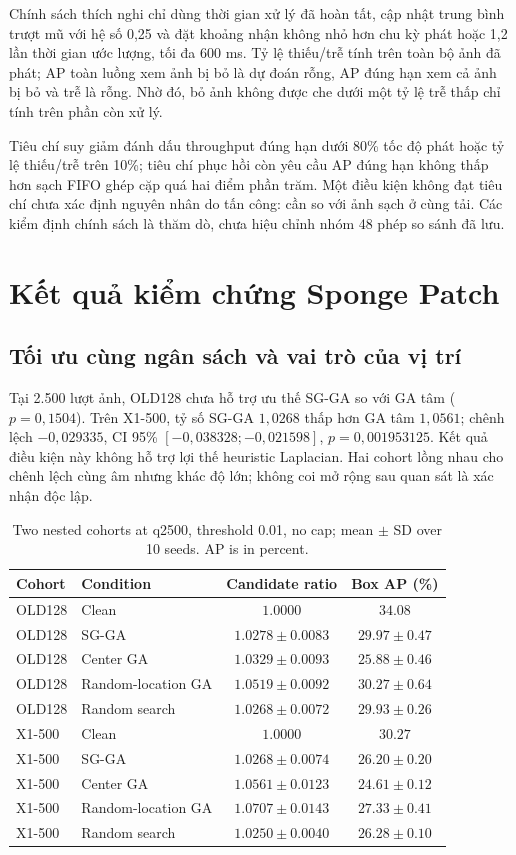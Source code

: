 \documentclass[a4paper,fleqn]{cas-dc}
\begin{document}
Chính sách thích nghi chỉ dùng thời gian xử lý đã hoàn tất, cập nhật trung bình trượt mũ với hệ số 0,25 và đặt khoảng nhận không nhỏ hơn chu kỳ phát hoặc 1,2 lần thời gian ước lượng, tối đa 600 ms. Tỷ lệ thiếu/trễ tính trên toàn bộ ảnh đã phát; AP toàn luồng xem ảnh bị bỏ là dự đoán rỗng, AP đúng hạn xem cả ảnh bị bỏ và trễ là rỗng. Nhờ đó, bỏ ảnh không được che dưới một tỷ lệ trễ thấp chỉ tính trên phần còn xử lý.

Tiêu chí suy giảm đánh dấu throughput đúng hạn dưới 80\% tốc độ phát hoặc tỷ lệ thiếu/trễ trên 10\%; tiêu chí phục hồi còn yêu cầu AP đúng hạn không thấp hơn sạch FIFO ghép cặp quá hai điểm phần trăm. Một điều kiện không đạt tiêu chí chưa xác định nguyên nhân do tấn công: cần so với ảnh sạch ở cùng tải. Các kiểm định chính sách là thăm dò, chưa hiệu chỉnh nhóm 48 phép so sánh đã lưu.

\section{Kết quả kiểm chứng Sponge Patch}

\subsection{Tối ưu cùng ngân sách và vai trò của vị trí}

Tại 2.500 lượt ảnh, OLD128 chưa hỗ trợ ưu thế SG-GA so với GA tâm ($p=0{,}1504$). Trên X1-500, tỷ số SG-GA $1{,}0268$ thấp hơn GA tâm $1{,}0561$; chênh lệch $-0{,}029335$, CI 95\% $[-0{,}038328;-0{,}021598]$, $p=0{,}001953125$. Kết quả điều kiện này không hỗ trợ lợi thế heuristic Laplacian. Hai cohort lồng nhau cho chênh lệch cùng âm nhưng khác độ lớn; không coi mở rộng sau quan sát là xác nhận độc lập.

\begin{table}[t]\centering\small
\caption{Two nested cohorts at q2500, threshold 0.01, no cap; mean $\pm$ SD over 10 seeds. AP is in percent.}
\begin{tabularx}{\textwidth}{@{}l X c c@{}}\toprule Cohort & Condition & Candidate ratio & Box AP (\%) \\ \midrule
OLD128 & Clean & $1.0000$ & $34.08$ \\
OLD128 & SG-GA & $1.0278\pm0.0083$ & $29.97\pm0.47$ \\
OLD128 & Center GA & $1.0329\pm0.0093$ & $25.88\pm0.46$ \\
OLD128 & Random-location GA & $1.0519\pm0.0092$ & $30.27\pm0.64$ \\
OLD128 & Random search & $1.0268\pm0.0072$ & $29.93\pm0.26$ \\
\midrule
X1-500 & Clean & $1.0000$ & $30.27$ \\
X1-500 & SG-GA & $1.0268\pm0.0074$ & $26.20\pm0.20$ \\
X1-500 & Center GA & $1.0561\pm0.0123$ & $24.61\pm0.12$ \\
X1-500 & Random-location GA & $1.0707\pm0.0143$ & $27.33\pm0.41$ \\
X1-500 & Random search & $1.0250\pm0.0040$ & $26.28\pm0.10$ \\
\bottomrule\end{tabularx}\label{tab:sponge_primary}\end{table}
\end{document}
